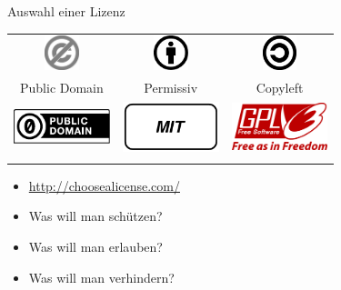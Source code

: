 \begin{frame}{Auswahl einer Lizenz}
	\begin{center}
		\begin{tabular}{ccc}
		\includegraphics[width=1cm]{res/PD-icon.pdf} & \includegraphics[width=1cm]{res/by.pdf} & \includegraphics[width=1cm]{res/copyleft.pdf} \\ 
		Public Domain & Permissiv & Copyleft \\
		\includegraphics[width=2.8cm]{res/cc-zero.pdf} & \includegraphics[width=2.8cm]{res/mit-logo.pdf} & \includegraphics[width=2.8cm]{res/gpl-v3-logo.pdf} \\
		\hspace{0.3\textwidth} & \hspace{0.3\textwidth} & \hspace{0.3\textwidth} \\
		\end{tabular} 
	\end{center}
	\begin{itemize}
		\item \url{http://choosealicense.com/}
	\end{itemize}
	\vspace{1cm}
\end{frame}
\note
{
	\begin{itemize}
		\item Was will man schützen?
		\item Was will man erlauben?
		\item Was will man verhindern?
	\end{itemize}
}

